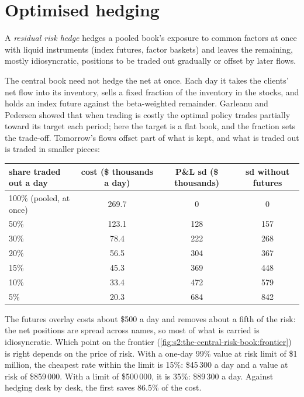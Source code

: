\section{Optimised hedging}

\begin{definition}\label{def:s2:the-central-risk-book:residual}
A \emph{residual risk hedge} hedges a pooled book's exposure to common factors at once with liquid instruments (index futures,
factor baskets) and leaves the remaining, mostly idiosyncratic, positions to be traded out gradually or offset by later flows.
\end{definition}

The central book need not hedge the net at once. Each day it takes the clients' net flow into its inventory, sells a fixed fraction of the inventory
in the stocks, and holds an index future against the beta-weighted remainder. Garleanu and Pedersen showed that when trading is costly the optimal
policy trades partially toward its target each period; here the target is a flat book, and the fraction sets the trade-off. Tomorrow's flows offset
part of what is kept, and what is traded out is traded in smaller pieces:

\begin{center}
\small
\begin{tabular}{@{}lccc@{}}
\toprule
share traded out a day & cost (\$ thousands a day) & P\&L sd (\$ thousands) & sd without futures\\
\midrule
100\% (pooled, at once) & 269.7 & 0 & 0\\
50\% & 123.1 & 128 & 157\\
30\% & 78.4 & 222 & 268\\
20\% & 56.5 & 304 & 367\\
15\% & 45.3 & 369 & 448\\
10\% & 33.4 & 472 & 579\\
5\% & 20.3 & 684 & 842\\
\bottomrule
\end{tabular}
\end{center}

The futures overlay costs about \$500 a day and removes about a fifth of the risk: the net positions are spread across names, so most of what is carried
is idiosyncratic. Which point on the frontier (\cref{fig:s2:the-central-risk-book:frontier}) is right depends on the price of risk. With a one-day 99\%
value at risk limit of \$1 million, the cheapest rate within the limit is 15\%: \$45\,300 a day and a value at risk of \$859\,000. With a limit of
\$500\,000, it is 35\%: \$89\,300 a day. Against hedging desk by desk, the first saves 86.5\% of the cost.

